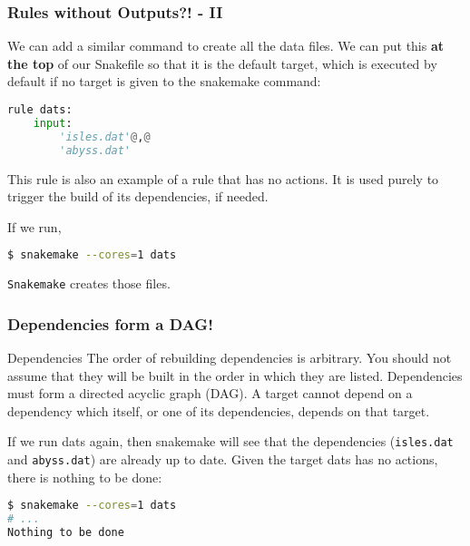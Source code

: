 \begin{frame}[fragile]
  \frametitle{Rules without Outputs?! - II }
  We can add a similar command to create all the data files. We can put this \textbf{at the top} of our Snakefile so that it is the default target, which is executed by default if no target is given to the snakemake command:
  \begin{lstlisting}[language=Python,style=Python]
rule dats:
    input:
        'isles.dat'@,@
        'abyss.dat'
  \end{lstlisting}
  This rule is also an example of a rule that has no actions. It is used purely to trigger the build of its dependencies, if needed.

  If we run,
  \begin{lstlisting}[language=Bash, style=Shell] 
$ snakemake --cores=1 dats
  \end{lstlisting}
  \texttt{Snakemake} creates those files.
\end{frame}

\begin{frame}[fragile]
  \frametitle{Dependencies form a DAG!}
  \begin{exampleblock}{Dependencies}
    The order of rebuilding dependencies is arbitrary. You should not assume that they will be built in the order in which they are listed.
    Dependencies must form a directed acyclic graph (DAG). A target cannot depend on a dependency which itself, or one of its dependencies, depends on that target.
  \end{exampleblock}
  If we run dats again, then snakemake will see that the dependencies (\texttt{isles.dat} and \texttt{abyss.dat}) are already up to date. Given the target dats has no actions, there is nothing to be done:
  \begin{lstlisting}[language=Bash, style=Shell] 
$ snakemake --cores=1 dats
# ...
Nothing to be done
  \end{lstlisting}
\end{frame}

